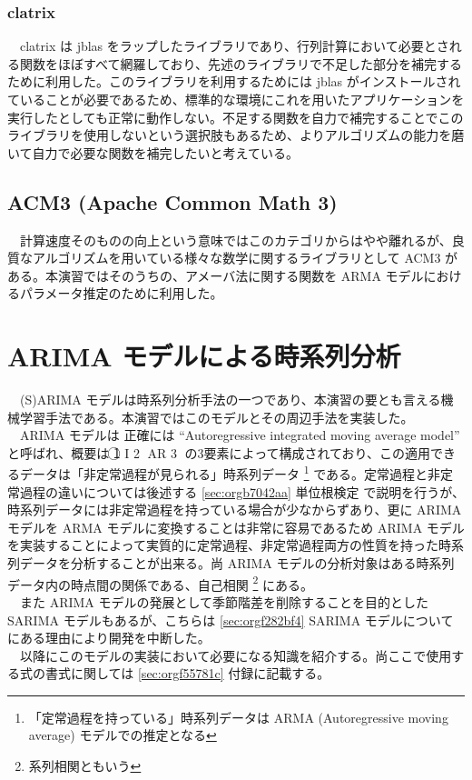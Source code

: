 \documentclass{scrartcl}
\begin{document}
\subsubsection{clatrix}
\label{sec:orgc003192}
　clatrix は jblas をラップしたライブラリであり、行列計算において必要とされる関数をほぼすべて網羅しており、先述のライブラリで不足した部分を補完するために利用した。このライブラリを利用するためには jblas がインストールされていることが必要であるため、標準的な環境にこれを用いたアプリケーションを実行したとしても正常に動作しない。不足する関数を自力で補完することでこのライブラリを使用しないという選択肢もあるため、よりアルゴリズムの能力を磨いて自力で必要な関数を補完したいと考えている。\\

\subsection{ACM3 (Apache Common Math 3)}
\label{sec:org52d9eac}
　計算速度そのものの向上という意味ではこのカテゴリからはやや離れるが、良質なアルゴリズムを用いている様々な数学に関するライブラリとして ACM3 がある。本演習ではそのうちの、アメーバ法に関する関数を ARMA モデルにおけるパラメータ推定のために利用した。\\
\section{ARIMA モデルによる時系列分析}
\label{sec:org73bc3ce}
　(S)ARIMA モデルは時系列分析手法の一つであり、本演習の要とも言える機械学習手法である。本演習ではこのモデルとその周辺手法を実装した。\\
　ARIMA モデルは 正確には ``Autoregressive integrated moving average model'' と呼ばれ、概要は \textcircled{\scriptsize 1} I \textcircled{\scriptsize 2} AR \textcircled{\scriptsize 3} の3要素によって構成されており、この適用できるデータは「非定常過程が見られる」時系列データ \footnote{「定常過程を持っている」時系列データは ARMA (Autoregressive moving average) モデルでの推定となる} である。定常過程と非定常過程の違いについては後述する \ref{sec:orgb7042aa} 単位根検定 で説明を行うが、時系列データには非定常過程を持っている場合が少なからずあり、更に ARIMA モデルを ARMA モデルに変換することは非常に容易であるため ARIMA モデルを実装することによって実質的に定常過程、非定常過程両方の性質を持った時系列データを分析することが出来る。尚 ARIMA モデルの分析対象はある時系列データ内の時点間の関係である、自己相関 \footnote{系列相関ともいう} にある。\\
　また ARIMA モデルの発展として季節階差を削除することを目的とした SARIMA モデルもあるが、こちらは \ref{sec:orgf282bf4} SARIMA モデルについて にある理由により開発を中断した。\\
　以降にこのモデルの実装において必要になる知識を紹介する。尚ここで使用する式の書式に関しては \ref{sec:orgf55781c} 付録に記載する。\\
\end{document}

